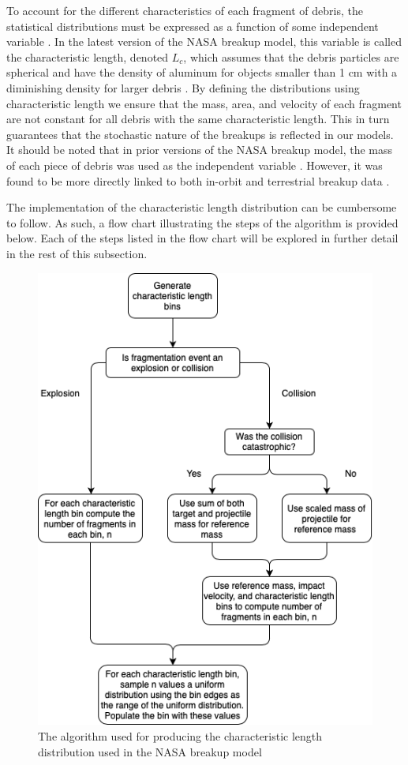 \documentclass[a4paper, 12pt]{article}
\begin{document}
To account for the different characteristics of each fragment of debris, the statistical distributions must be expressed as a function of some independent variable \citep{johnson_nasas_2001}. In the latest version of the NASA breakup model, this variable is called the characteristic length, denoted $L_c$, which assumes that the debris particles are spherical and have the density of aluminum for objects smaller than 1 cm with a diminishing density for larger debris \citep{johnson_nasas_2001}. By defining the distributions using characteristic length we ensure that the mass, area, and velocity of each fragment are not constant for all debris with the same characteristic length. This in turn guarantees that the stochastic nature of the breakups is reflected in our models. It should be noted that in prior versions of the NASA breakup model, the mass of each piece of debris was used as the independent variable \citep{krisko_proper_2011}. However, it was found to be more directly linked to both in-orbit and terrestrial breakup data \citep{johnson_nasas_2001}.

The implementation of the characteristic length distribution can be cumbersome to follow. As such, a flow chart illustrating the steps of the algorithm is provided below. Each of the steps listed in the flow chart will be explored in further detail in the rest of this subsection.

\begin{figure}[H]
	\centering
	\includegraphics[scale=0.5, trim=0cm 0cm 0cm 5cm]{L_c_flow}
	\caption{The algorithm used for producing the characteristic length distribution used in the NASA breakup model}
\end{figure}
\end{document}
